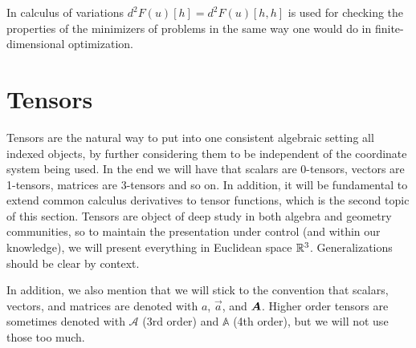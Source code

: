 
In calculus of variations $d^2 F(u)[h] = d^2 F(u)[h,h]$ is used for checking the properties of the minimizers of problems in the same way one would do in finite-dimensional optimization.

\section{Tensors}\label{sec:tensors}
Tensors are the natural way to put into one consistent algebraic setting all indexed objects, by further considering them to be independent of the coordinate system being used. In the end we will have that scalars are 0-tensors, vectors are 1-tensors, matrices are 3-tensors and so on. In addition, it will be fundamental to extend common calculus derivatives to tensor functions, which is the second topic of this section. Tensors are object of deep study in both algebra and geometry communities, so to maintain the presentation under control (and within our knowledge), we will present everything in Euclidean space $\mathbb{R}^3$. Generalizations should be clear by context. 

In addition, we also mention that we will stick to the convention that scalars, vectors, and matrices are denoted with $a$, $\vec a$, and $\mat A$. Higher order tensors are sometimes denoted with $\mathcal A$ (3rd order) and $\mathbb A$ (4th order), but we will not use those too much. 

